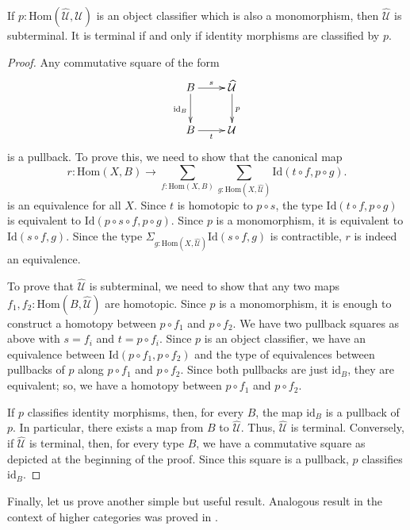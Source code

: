 \documentclass[reqno]{mscs}
\newcommand{\fs}[1]{\mathrm{#1}}
\newcommand{\Hom}{\fs{Hom}}
\newcommand{\Id}{\fs{Id}}
\newcommand{\id}{\fs{id}}
\numberwithin{figure}{section}
\begin{document}
\begin{prop}
If $p : \Hom(\widehat{\mathcal{U}},\mathcal{U})$ is an object classifier which is also a monomorphism, then $\widehat{\mathcal{U}}$ is subterminal.
It is terminal if and only if identity morphisms are classified by $p$.
\end{prop}
\begin{proof}
Any commutative square of the form
\[ \xymatrix{ B \ar[r]^s \ar[d]_{\id_B} & \widehat{\mathcal{U}} \ar[d]^p \\
              B \ar[r]_t                & \mathcal{U}
            } \]
is a pullback.
To prove this, we need to show that the canonical map
\[ r : \Hom(X,B) \to \sum_{f : \Hom(X,B)} \sum_{g : \Hom(X,\widehat{\mathcal{U}})} \Id(t \circ f, p \circ g). \]
is an equivalence for all $X$.
Since $t$ is homotopic to $p \circ s$, the type $\Id(t \circ f, p \circ g)$ is equivalent to $\Id(p \circ s \circ f, p \circ g)$.
Since $p$ is a monomorphism, it is equivalent to $\Id(s \circ f, g)$.
Since the type $\Sigma_{g : \Hom(X,\widehat{\mathcal{U}})} \Id(s \circ f, g)$ is contractible, $r$ is indeed an equivalence.

To prove that $\widehat{\mathcal{U}}$ is subterminal, we need to show that any two maps $f_1,f_2 : \Hom(B,\widehat{\mathcal{U}})$ are homotopic.
Since $p$ is a monomorphism, it is enough to construct a homotopy between $p \circ f_1$ and $p \circ f_2$.
We have two pullback squares as above with $s = f_i$ and $t = p \circ f_i$.
Since $p$ is an object classifier, we have an equivalence between $\Id(p \circ f_1, p \circ f_2)$ and the type of equivalences between pullbacks of $p$ along $p \circ f_1$ and $p \circ f_2$.
Since both pullbacks are just $\id_B$, they are equivalent; so, we have a homotopy between $p \circ f_1$ and $p \circ f_2$.

If $p$ classifies identity morphisms, then, for every $B$, the map $\id_B$ is a pullback of $p$.
In particular, there exists a map from $B$ to $\widehat{\mathcal{U}}$.
Thus, $\widehat{\mathcal{U}}$ is terminal.
Conversely, if $\widehat{\mathcal{U}}$ is terminal, then, for every type $B$, we have a commutative square as depicted at the beginning of the proof.
Since this square is a pullback, $p$ classifies $\id_B$.
\end{proof}

Finally, let us prove another simple but useful result.
Analogous result in the context of higher categories was proved in \cite[Theorem~3.28]{rasekh-eht}.
\end{document}
